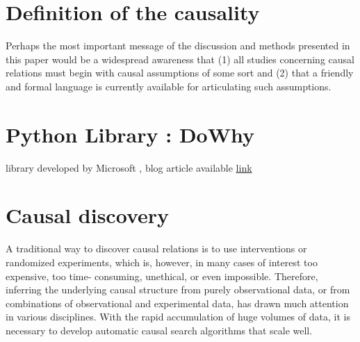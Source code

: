 \documentclass{article}
\begin{document}
\section{Definition of the causality}

Perhaps the most important message of the discussion and methods presented in this paper would be a widespread awareness that (1) all studies concerning causal relations must begin with causal assumptions of some sort and (2) that a friendly and formal language is currently available for articulating such assumptions.\cite{pearl2010mathematics}

\cite{rubin2005causal}

\section{Python Library : DoWhy}
library developed by Microsoft \cite{dowhy}, blog article available \href{https://www.microsoft.com/en-us/research/blog/dowhy-a-library-for-causal-inference/}{link}


\section{Causal discovery}

A traditional way to discover causal relations is to use interventions or randomized experiments, which is, however, in many cases of interest too expensive, too time- consuming, unethical, or even impossible. Therefore, inferring the underlying causal structure from purely observational data, or from combinations of observational and experimental data, has drawn much attention in various disciplines. With the rapid accumulation of huge volumes of data, it is necessary to develop automatic causal search algorithms that scale well.\cite{10.3389/fgene.2019.00524}

\newpage
\nocite{*}    %

\end{document}
